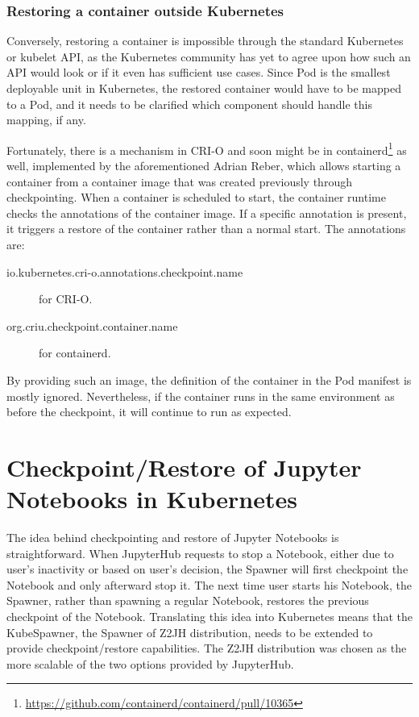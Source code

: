 \documentclass[
  digital,     %
  oneside,     %
  nosansbold,  %
  nocolorbold, %
  lof,         %
  lot,         %
]{fithesis4}
\begin{document}
\subsection{Restoring a container outside Kubernetes}
Conversely, restoring a container is impossible through the standard Kubernetes or kubelet API, as the Kubernetes community has yet to agree upon how such an API would look or if it even has sufficient use cases. Since Pod is the smallest deployable unit in Kubernetes, the restored container would have to be mapped to a Pod, and it needs to be clarified which component should handle this mapping, if any.

Fortunately, there is a mechanism in CRI-O and soon might be in containerd\footnote{\url{https://github.com/containerd/containerd/pull/10365}} as well, implemented by the aforementioned Adrian Reber, which allows starting a container from a container image that was created previously through checkpointing. When a container is scheduled to start, the container runtime checks the annotations of the container image. If a specific annotation is present, it triggers a restore of the container rather than a normal start. The annotations are:
\begin{description}
    \item[io.kubernetes.cri-o.annotations.checkpoint.name] for CRI-O.
    \item[org.criu.checkpoint.container.name] for containerd.
\end{description}

By providing such an image, the definition of the container in the Pod manifest is mostly ignored. Nevertheless, if the container runs in the same environment as before the checkpoint, it will continue to run as expected.


\chapter{Checkpoint/Restore of Jupyter Notebooks in Kubernetes}
The idea behind checkpointing and restore of Jupyter Notebooks is straightforward. When JupyterHub requests to stop a Notebook, either due to user's inactivity or based on user's decision, the Spawner will first checkpoint the Notebook and only afterward stop it. The next time user starts his Notebook, the Spawner, rather than spawning a regular Notebook, restores the previous checkpoint of the Notebook. Translating this idea into Kubernetes means that the KubeSpawner, the Spawner of Z2JH distribution, needs to be extended to provide checkpoint/restore capabilities. The Z2JH distribution was chosen as the more scalable of the two options provided by JupyterHub.
\end{document}
